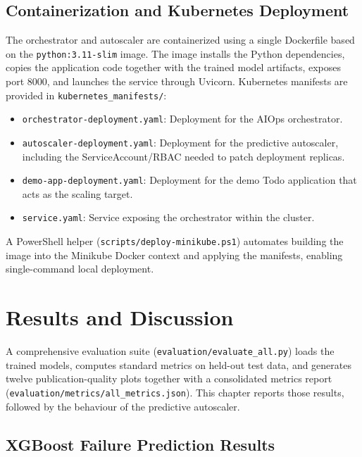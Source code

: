 \documentclass[a4paper,14pt,onecolumn]{report}
\begin{document}
\section{Containerization and Kubernetes Deployment}

The orchestrator and autoscaler are containerized using a single Dockerfile based on the \texttt{python:3.11-slim} image. The image installs the Python dependencies, copies the application code together with the trained model artifacts, exposes port 8000, and launches the service through Uvicorn. Kubernetes manifests are provided in \texttt{kubernetes\_manifests/}:

\begin{itemize}
    \item \texttt{orchestrator-deployment.yaml}: Deployment for the AIOps orchestrator.
    \item \texttt{autoscaler-deployment.yaml}: Deployment for the predictive autoscaler, including the ServiceAccount/RBAC needed to patch deployment replicas.
    \item \texttt{demo-app-deployment.yaml}: Deployment for the demo Todo application that acts as the scaling target.
    \item \texttt{service.yaml}: Service exposing the orchestrator within the cluster.
\end{itemize}

A PowerShell helper (\texttt{scripts/deploy-minikube.ps1}) automates building the image into the Minikube Docker context and applying the manifests, enabling single-command local deployment.

\chapter{Results and Discussion}

A comprehensive evaluation suite (\texttt{evaluation/evaluate\_all.py}) loads the trained models, computes standard metrics on held-out test data, and generates twelve publication-quality plots together with a consolidated metrics report (\texttt{evaluation/metrics/all\_metrics.json}). This chapter reports those results, followed by the behaviour of the predictive autoscaler.

\section{XGBoost Failure Prediction Results}
\end{document}
